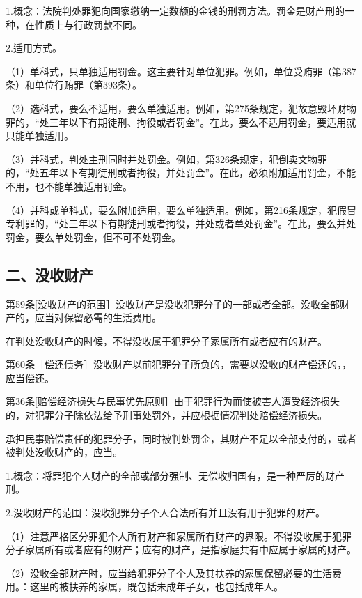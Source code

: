 1.概念：法院判处罪犯向国家缴纳一定数额的金钱的刑罚方法。罚金是财产刑的一种，在性质上与行政罚款不同。

2.适用方式。

（1）单科式，只单独适用罚金。这主要针对单位犯罪。例如，单位受贿罪（第387条）和单位行贿罪（第393条）。

（2）选科式，要么不适用，要么单独适用。例如，第275条规定，犯故意毁坏财物罪的，“处三年以下有期徒刑、拘役或者罚金”。在此，要么不适用罚金，要适用就只能单独适用。

（3）并科式，判处主刑同时并处罚金。例如，第326条规定，犯倒卖文物罪的，“处五年以下有期徒刑或者拘役，并处罚金”。在此，必须附加适用罚金，不能不用，也不能单独适用罚金。

（4）并科或单科式，要么附加适用，要么单独适用。例如，第216条规定，犯假冒专利罪的，“处三年以下有期徒刑或者拘役，并处或者单处罚金”。在此，要么并处罚金，要么单处罚金，但不可不处罚金。

\subsection*{二、没收财产}

第59条[没收财产的范围］没收财产是没收犯罪分子的一部或者全部。没收全部财产的，应当对保留必需的生活费用。

在判处没收财产的时候，不得没收属于犯罪分子家属所有或者应有的财产。

第60条［偿还债务］没收财产以前犯罪分子所负的，需要以没收的财产偿还的，，应当偿还。

第36条[赔偿经济损失与民事优先原则］由于犯罪行为而使被害人遭受经济损失的，对犯罪分子除依法给予刑事处罚外，并应根据情况判处赔偿经济损失。

承担民事赔偿责任的犯罪分子，同时被判处罚金，其财产不足以全部支付的，或者被判处没收财产的，应当。

1.概念：将罪犯个人财产的全部或部分强制、无偿收归国有，是一种严厉的财产刑。

2.没收财产的范围：没收犯罪分子个人合法所有并且没有用于犯罪的财产。

（1）注意严格区分罪犯个人所有财产和家属所有财产的界限。不得没收属于犯罪分子家属所有或者应有的财产；应有的财产，是指家庭共有中应属于家属的财产。

（2）没收全部财产时，应当给犯罪分子个人及其扶养的家属保留必要的生活费用。：这里的被扶养的家属，既包括未成年子女，也包括成年人。

